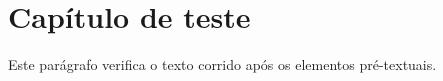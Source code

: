 \documentclass[12pt,a4paper,english,brazil]{abntex2}
\begin{document}






\chapter{Capítulo de teste}
Este parágrafo verifica o texto corrido após os elementos pré-textuais.






\postextual


\end{document}
